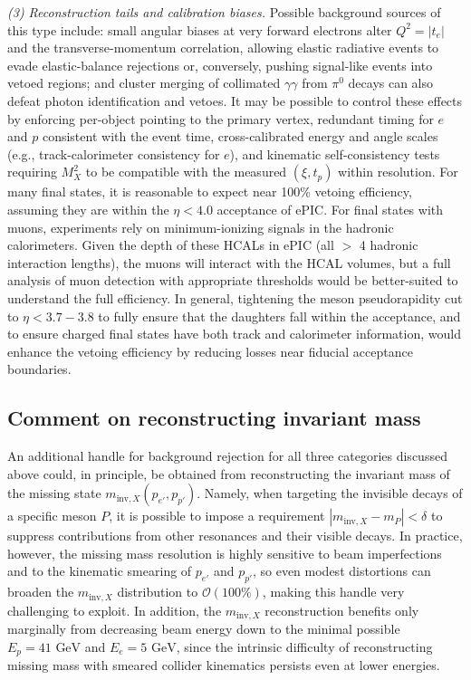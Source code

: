 \documentclass[aps,prd,preprintnumbers,superscriptaddress,nofootinbib,floatfix,twocolumn,notitlepage,reprint]{revtex4-2}
\newcommand{\cO}{\mathcal{O}}
\begin{document}
\emph{(3) Reconstruction tails and calibration biases.}  
Possible background sources of this type include: small angular biases at very forward electrons alter $Q^2=|t_e|$ and the transverse-momentum correlation, allowing elastic radiative events to evade elastic-balance rejections or, conversely, pushing signal-like events into vetoed regions; and cluster merging of collimated $\gamma\gamma$ from $\pi^0$ decays can also defeat photon identification and vetoes.  
It may be possible to control these effects by enforcing per-object pointing to the primary vertex, redundant timing for $e$ and $p$ consistent with the event time, cross-calibrated energy and angle scales (e.g., track-calorimeter consistency for $e$), and kinematic self-consistency tests requiring $M_X^2$ to be compatible with the measured $(\xi,t_p)$ within resolution. For many final states, it is reasonable to expect near 100\% vetoing efficiency, assuming they are within the $\eta < 4.0$ acceptance of ePIC. For final states with muons, experiments rely on minimum-ionizing signals in the hadronic calorimeters. Given the depth of these HCALs in ePIC (all $>$ 4 hadronic interaction lengths), the muons will interact with the HCAL volumes, but a full analysis of muon detection with appropriate thresholds would be better-suited to understand the full efficiency. In general, tightening the meson pseudorapidity cut to $\eta < 3.7-3.8$ to fully ensure that the daughters fall within the acceptance, and to ensure charged final states have both track and calorimeter information, would enhance the vetoing efficiency by reducing losses near fiducial acceptance boundaries. 

\subsection{Comment on reconstructing invariant mass}

An additional handle for background rejection for all three categories discussed above could, in principle, be obtained from reconstructing the invariant mass of the missing state $m_{\text{inv},X}(p_{e'},p_{p'})$. 
Namely, when targeting the invisible decays of a specific meson $P$, it is possible to impose a requirement $|m_{\text{inv},X}-m_{P}| < \delta$ to suppress contributions from other resonances and their visible decays. 
In practice, however, the missing mass resolution is highly sensitive to beam imperfections and to the kinematic smearing of $p_{e'}$ and $p_{p'}$, so even modest distortions can broaden the $m_{\text{inv},X}$ distribution to $\cO(100\%)$, making this handle very challenging to exploit. In addition, the $m_{\text{inv},X}$ reconstruction benefits only marginally from decreasing beam energy down to the minimal possible $E_{p} = 41\text{ GeV}$ and $E_{e} = 5\text{ GeV}$, since the intrinsic difficulty of reconstructing missing mass with smeared collider kinematics persists even at lower energies.
\end{document}
